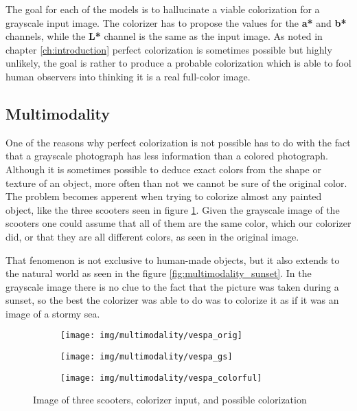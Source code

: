 The goal for each of the models is to hallucinate a viable colorization for a grayscale 
input image. The colorizer has to propose the values for the \textbf{a*} and \textbf{b*}
channels, while the \textbf{L*} channel is the same as the input image. As noted in chapter \ref{ch:introduction}
perfect colorization is sometimes possible but highly unlikely, the goal is rather to 
produce a probable colorization which is able to fool human observers into thinking it is a 
real full-color image.

\subsection{Multimodality}
\label{sec:multimodality}

One of the reasons why perfect colorization is not possible has to do with the 
fact that a grayscale photograph has less information than a colored photograph.
Although it is sometimes possible to deduce exact colors from the shape or texture of
an object, more often than not we cannot be sure of the original color.
The problem becomes apperent when trying to colorize almost any painted object,
like the three scooters seen in figure \ref{fig:multimodality_scooters}. Given the 
grayscale image of the scooters one could assume that all of them are the same
color, which our colorizer did, or that they are all different colors, as seen 
in the original image. 

That fenomenon is not exclusive to human-made objects, 
but it also extends to the natural world as seen in the figure 
\ref{fig:multimodality_sunset}. In the grayscale image there is no clue to the 
fact that the picture was taken during a sunset, so the best the colorizer
was able to do was to colorize it as if it was an image of a stormy sea.

\begin{figure}
	\centering
	\begin{subfigure}{.32\textwidth}
		\centering
		\texttt{[image: img/multimodality/vespa\_orig]}
	\end{subfigure}
	\begin{subfigure}{.32\textwidth}
		\centering
		\texttt{[image: img/multimodality/vespa\_gs]}
	\end{subfigure}
    \begin{subfigure}{.32\textwidth}
		\centering
		\texttt{[image: img/multimodality/vespa\_colorful]}
	\end{subfigure}
    \caption{Image of three scooters, colorizer input, and possible colorization}
	\label{fig:multimodality_scooters}
\end{figure}

